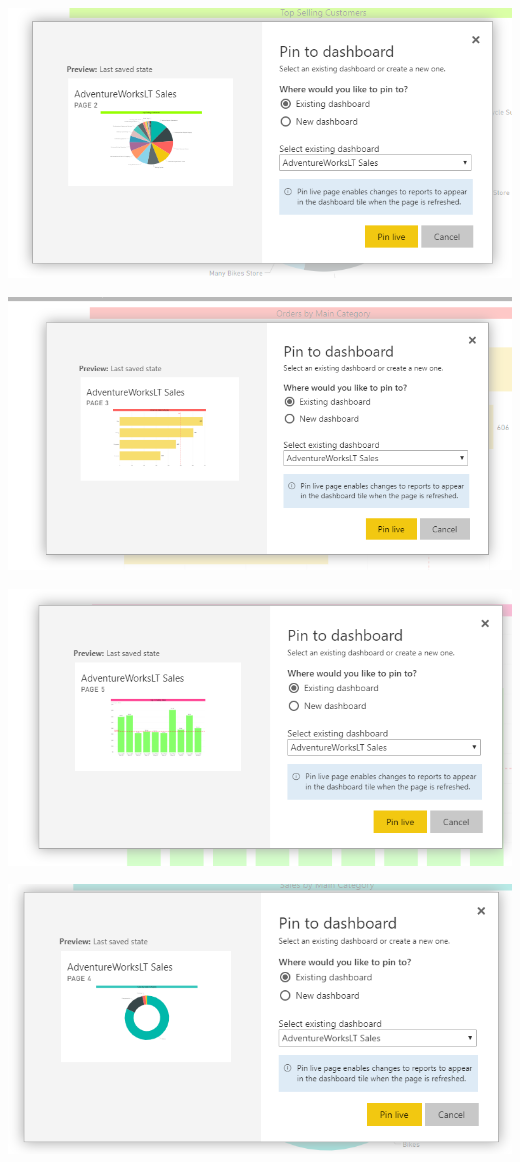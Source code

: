 	\begin{center}
	\includegraphics[width=18cm]{./Imagenes/Imagen19}
	\end{center}	

	\begin{center}
	\includegraphics[width=18cm]{./Imagenes/Imagen20}
	\end{center}	

	\begin{center}
	\includegraphics[width=18cm]{./Imagenes/Imagen21}
	\end{center}	

	\begin{center}
	\includegraphics[width=18cm]{./Imagenes/Imagen22}
	\end{center}	
